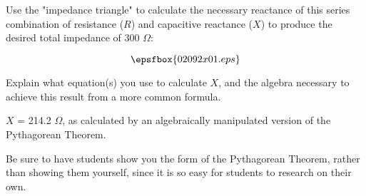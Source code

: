

Use the "impedance triangle" to calculate the necessary reactance of this series combination of resistance ($R$) and capacitive reactance ($X$) to produce the desired total impedance of 300 $\Omega$:

$$\epsfbox{02092x01.eps}$$

Explain what equation(s) you use to calculate $X$, and the algebra necessary to achieve this result from a more common formula.







$X$ = 214.2 $\Omega$, as calculated by an algebraically manipulated version of the Pythagorean Theorem.







Be sure to have students show you the form of the Pythagorean Theorem, rather than showing them yourself, since it is so easy for students to research on their own.





